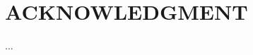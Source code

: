 \documentclass[letterpaper, 10 pt, conference]{ieeeconf}  %
\begin{document}
%


\section*{ACKNOWLEDGMENT}

...






\end{document}

